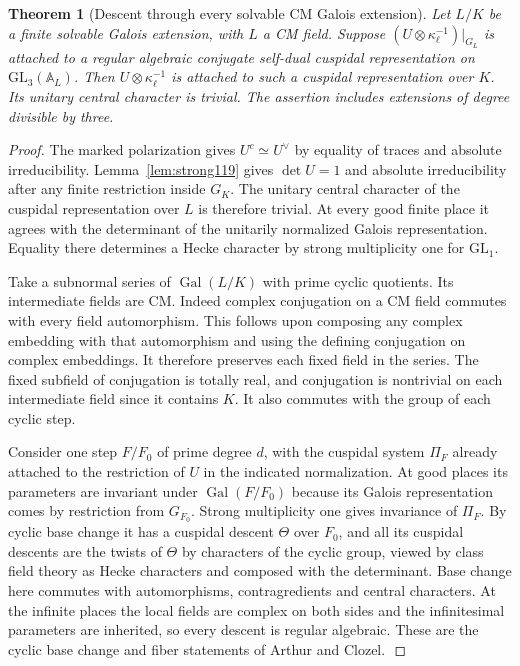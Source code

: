 \documentclass[a4paper,11pt]{article}
\newtheorem{theorem}[proposition]{Theorem}
\theoremstyle{definition}
\theoremstyle{remark}
\numberwithin{equation}{section}
\begin{document}
\begin{theorem}[Descent through every solvable CM Galois extension]\leavevmode
\label{thm:gaussdesc402}
Let \(L/K\) be a finite solvable Galois extension, with \(L\) a
CM field. Suppose \((U\otimes\kappa_\ell^{-1})|_{G_L}\) is
attached to a regular algebraic conjugate self-dual cuspidal
representation on \(\mathrm{GL}_3(\mathbb A_L)\). Then
\(U\otimes\kappa_\ell^{-1}\) is attached to such a cuspidal
representation over \(K\). Its unitary central character is
trivial. The assertion includes extensions of degree divisible
by three.
\end{theorem}
\begin{proof}
The marked polarization gives \(U^c\simeq U^\vee\) by equality
of traces and absolute irreducibility. Lemma~\ref{lem:strong119}
gives \(\det U=1\) and absolute irreducibility after any finite
restriction inside \(G_K\). The unitary central character of the
cuspidal representation over \(L\) is therefore trivial. At
every good finite place it agrees with the determinant of the
unitarily normalized Galois representation. Equality there
determines a Hecke character by strong multiplicity one for
\(\mathrm{GL}_1\).

Take a subnormal series of \(\operatorname{Gal}(L/K)\) with
prime cyclic quotients. Its intermediate fields are CM. Indeed
complex conjugation on a CM field commutes with every field
automorphism. This follows upon composing any complex embedding
with that automorphism and using the defining conjugation on
complex embeddings. It therefore preserves each fixed field in
the series. The fixed subfield of conjugation is totally real,
and conjugation is nontrivial on each intermediate field since
it contains \(K\). It also commutes with the group of each
cyclic step.

Consider one step \(F/F_0\) of prime degree \(d\), with the
cuspidal system \(\Pi_F\) already attached to the restriction
of \(U\) in the indicated normalization. At good places its
parameters are invariant under \(\operatorname{Gal}(F/F_0)\)
because its Galois representation comes by restriction from
\(G_{F_0}\). Strong multiplicity one gives invariance of
\(\Pi_F\). By cyclic base change it has a cuspidal descent
\(\Theta\) over \(F_0\), and all its cuspidal descents are the
twists of \(\Theta\) by characters of the cyclic group, viewed
by class field theory as Hecke characters and composed with the
determinant. Base change here commutes with automorphisms,
contragredients and central characters. At the infinite places
the local fields are complex on both sides and the infinitesimal
parameters are inherited, so every descent is regular algebraic.
These are the cyclic base change and fiber statements of
Arthur and Clozel.\,\cite{VIII-VI-I-ac123}


\end{proof}
\end{document}
